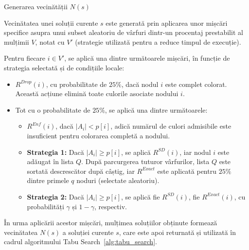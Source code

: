 \begin{algorithm}[H]
\caption{Generarea vecinătății $N(s)$}\label{alg:generator}
\begin{algorithmic}[1]
\small
{}
\EndIf{}
 
    \EndIf{}
        \Else{}
            \Else{}
                 
            \EndIf{}
        \EndIf{}
    \EndIf{}
\EndFor{}
\EndIf{}
\end{algorithmic}
\end{algorithm}
Vecinătatea unei soluții curente $s$ este generată prin aplicarea unor mișcări specifice asupra unui subset aleatoriu de vârfuri dintr-un procentaj prestabilit al mulțimii $V$, notat cu $V'$ (strategie utilizată pentru a reduce timpul de execuție).

Pentru fiecare $i \in V'$, se aplică una dintre următoarele mișcări, în funcție de strategia selectată și de condițiile locale:

\begin{itemize}
\item \textbf{$R^{Drop}(i)$}, cu probabilitate de $25\%$, dacă nodul $i$ este complet colorat. Această acțiune elimină toate culorile asociate nodului $i$.
 \item Tot cu o probabilitate de $25\%$, se aplică una dintre următoarele:
\begin{itemize}
    \item \textbf{$R^{Enf}(i)$}, dacă $|A_i| < p[i]$, adică numărul de culori admisibile este insuficient pentru colorarea completă a nodului.
    
    \item \textbf{Strategia 1:} Dacă $|A_i| \geq p[i]$, se aplică $R^{SD}(i)$, iar nodul $i$ este adăugat în lista $Q$. După parcurgerea tuturor vârfurilor, lista $Q$ este sortată descrescător după câștig, iar $R^{Exact}$ este aplicată pentru $25\%$ dintre primele $q$ noduri (selectate aleatoriu).
    
    \item \textbf{Strategia 2:} Dacă $|A_i| \geq p[i]$, se aplică fie $R^{SD}(i)$, fie $R^{Exact}(i)$, cu probabilități $\gamma$ și $1 - \gamma$, respectiv.
\end{itemize}
\end{itemize}
În urma aplicării acestor mișcări, mulțimea soluțiilor obținute formează vecinătatea $N(s)$ a soluției curente $s$, care este apoi returnată și utilizată în cadrul algoritmului Tabu Search~\ref{alg:tabu_search}.



